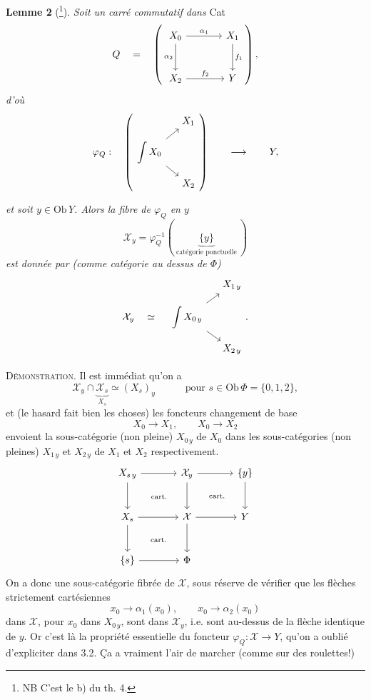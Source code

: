 \documentclass[11pt]{article}
\newcommand{\printedpage}[1]{\marginpar{\footnotesize p.~#1}}
\newcommand{\msp}[1]{\marginpar{\footnotesize [#1]}}
\newcommand{\intdiag}[3]{\begin{tikzcd}[row sep=small,column sep=small,ampersand replacement=\&,baseline=(\tikzcdmatrixname-2-1.base)]
 \& #2 \\
 \displaystyle\int #1 \arrow[ur] \arrow[dr] \& \\
 \& #3
\end{tikzcd}}
\begin{document}
\noindent\textbf{Lemme 2} (\footnote[106]{NB C'est le b) du th. 4.}). \textit{Soit un carré commutatif dans} Cat
\[
Q \quad = \quad
\left(
\begin{tikzcd}[row sep=large,column sep=large]
X_0 \arrow[r, "\alpha_1"] \arrow[d, "\alpha_2"'] & X_1 \arrow[d, "f_1"] \\
X_2 \arrow[r, "f_2"] & Y
\end{tikzcd}
\right),
\]
\textit{d'où}
\[
\varphi_Q : \quad \left( \intdiag{X_0}{X_1}{X_2} \right) \qquad\longrightarrow\qquad Y,
\]

\msp{page 155}
\textit{et soit $y\in\mathrm{Ob}\,Y$. Alors la fibre de $\varphi_Q$ en $y$}
\[
\mathcal{X}_y = \varphi_Q^{-1}(\ \underbrace{\{y\}}_{\text{catégorie ponctuelle}}\ )
\]
\textit{est donnée par (comme catégorie au dessus de $\Phi$)}
\[
\mathcal{X}_y \quad\simeq\quad \intdiag{X_{0\,y}}{X_{1\,y}}{X_{2\,y}} .
\]

\noindent\textsc{Démonstration.} Il est immédiat qu'on a
\[
\mathcal{X}_y\cap\underbrace{\mathcal{X}_s}_{X_s}\simeq(X_s)_y \qquad\quad \text{pour } s\in\mathrm{Ob}\,\Phi=\{0,1,2\},
\]
\printedpage{107}
et (le hasard fait bien les choses) les foncteurs changement de base
\[
X_0\longrightarrow X_1, \qquad X_0\longrightarrow X_2
\]
envoient la sous-catégorie (non pleine) $X_{0\,y}$ de $X_0$ dans les sous-catégories (non pleines) $X_{1\,y}$ et $X_{2\,y}$ de $X_1$ et $X_2$ respectivement.
\[
\begin{tikzcd}[row sep=large,column sep=large]
X_{s\,y} \arrow[r] \arrow[d] \arrow[dr, phantom, "\scriptstyle\text{cart.}"] & \mathcal{X}_y \arrow[r] \arrow[d] \arrow[dr, phantom, "\scriptstyle\text{cart.}"] & \{y\} \arrow[d] \\
X_s \arrow[r] \arrow[d] \arrow[dr, phantom, "\scriptstyle\text{cart.}"] & \mathcal{X} \arrow[r] \arrow[d] & Y \\
\{s\} \arrow[r] & \Phi &
\end{tikzcd}
\]
On a donc une sous-catégorie fibrée de $\mathcal{X}$, sous réserve de vérifier que les flèches strictement cartésiennes
\[
x_0\longrightarrow\alpha_1(x_0), \qquad x_0\longrightarrow\alpha_2(x_0)
\]
dans $\mathcal{X}$, pour $x_0$ dans $X_{0\,y}$, sont dans $\mathcal{X}_y$, i.e. sont au-dessus de la flèche identique de $y$. Or c'est là la propriété essentielle
\msp{page 156}
du foncteur $\varphi_Q : \mathcal{X}\longrightarrow Y$, qu'on a oublié d'expliciter dans 3.2. Ça a vraiment l'air de marcher (comme sur des roulettes!)
\end{document}
